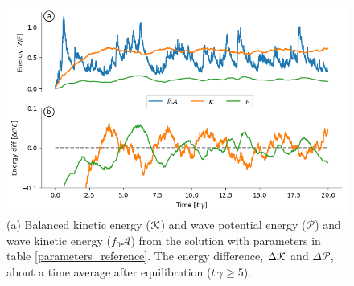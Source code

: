 \documentclass[12pt]{article}
\renewcommand{\P}{\mathcal{P}}
\newcommand{\A}{  \mathcal{A}}
\begin{document}
\begin{figure}
\centering
\includegraphics[width=.825\textwidth]{figs/energies_reference.png}
\caption{(a) Balanced kinetic energy ($\mathcal{K}$) and wave potential energy ($\P$) and wave
         kinetic energy ($f_0 \A$)  from the solution with parameters in table
         \ref{parameters_reference}. The energy difference, $\Delta \mathcal{K}$ and $\Delta \P$,
         about a time average after equilibration ($t\,\gamma \ge 5$).}
        \label{energies_reference}
\end{figure}
\end{document}
